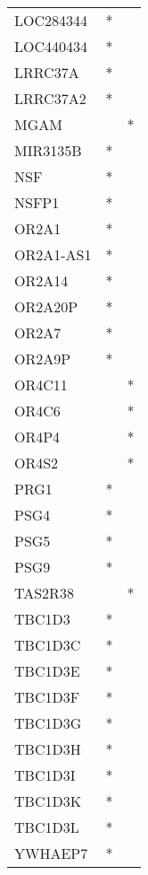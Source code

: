 \begin{tabular}{lcc}
LOC284344    &              * &            \\
LOC440434    &              * &            \\
LRRC37A      &              * &            \\
LRRC37A2     &              * &            \\
MGAM         &                &          * \\
MIR3135B     &              * &            \\
NSF          &              * &            \\
NSFP1        &              * &            \\
OR2A1        &              * &            \\
OR2A1-AS1    &              * &            \\
OR2A14       &              * &            \\
OR2A20P      &              * &            \\
OR2A7        &              * &            \\
OR2A9P       &              * &            \\
OR4C11       &                &          * \\
OR4C6        &                &          * \\
OR4P4        &                &          * \\
OR4S2        &                &          * \\
PRG1         &              * &            \\
PSG4         &              * &            \\
PSG5         &              * &            \\
PSG9         &              * &            \\
TAS2R38      &                &          * \\
TBC1D3       &              * &            \\
TBC1D3C      &              * &            \\
TBC1D3E      &              * &            \\
TBC1D3F      &              * &            \\
TBC1D3G      &              * &            \\
TBC1D3H      &              * &            \\
TBC1D3I      &              * &            \\
TBC1D3K      &              * &            \\
TBC1D3L      &              * &            \\
YWHAEP7      &              * &            \\
\bottomrule
\end{tabular}
